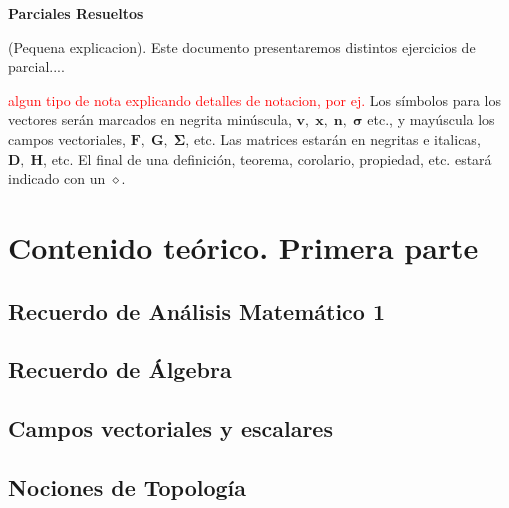 \documentclass[10pt, a4paper]{report}
\begin{document}
    \newpage

    \setcounter{page}{1}
    \begin{center}
        \textbf{ \noindent \textbf{Parciales Resueltos}}
    \end{center}
    \vspace{3cm}
      
    (Pequena explicacion).  Este documento presentaremos distintos ejercicios de parcial....
    \newpage

    \tableofcontents
        \setcounter{page}{1}
    \vfill
    \textcolor{red}{algun tipo de nota explicando detalles de notacion, por ej.} Los símbolos para los vectores serán marcados en negrita minúscula, $\mathbf{v},\;\mathbf{x},\;\mathbf{n},\;\boldsymbol{\sigma}$ etc., y mayúscula los campos vectoriales, $\mathbf{F},\;\mathbf{G},\;\boldsymbol{\Sigma}$, etc. Las matrices estarán en negritas e italicas, $\boldsymbol{D},\;\boldsymbol{H}$, etc. El final de una definición, teorema, corolario, propiedad, etc. estará indicado con un $\diamond$.

    \chapter{Contenido teórico. Primera parte}
        \section{Recuerdo de Análisis Matemático 1}
            
        \section{Recuerdo de Álgebra}
            
        \section{Campos vectoriales y escalares}
            
        \section{Nociones de Topolog\'ia}
            
\end{document}
